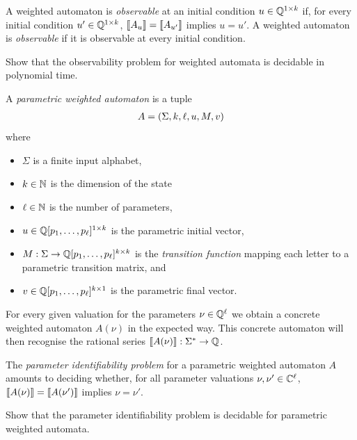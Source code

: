 A weighted automaton is \emph{observable} at an initial condition $u \in \mathbb Q^{1 \times k}$
if, for every initial condition $u' \in \mathbb Q^{1 \times k}$,
$\llbracket{A_u}\rrbracket = \llbracket{A_{u'}}\rrbracket$ implies $u = u'$.
%
A weighted automaton is \emph{observable} if it is observable at every initial condition.

 \begin{exercise}
    Show that the observability problem for weighted automata is decidable in polynomial time.
 \end{exercise}

A \emph{parametric weighted automaton} is a tuple
%
\begin{align*}
    A = \left( \Sigma, k, \ell, u, M, v \right)
\end{align*}
%
where
%
\begin{itemize}
    \item $\Sigma$ is a finite input alphabet,
    \item $k \in \mathbb N$ is the dimension of the state
    \item $\ell \in \mathbb N$ is the number of parameters,
    \item $u \in \mathbb Q[p_1, \dots, p_\ell]^{1 \times k}$ is the parametric initial vector,
    \item $M : \Sigma \to \mathbb Q[p_1, \dots, p_\ell]^{k \times k}$
    is the \emph{transition function} mapping each letter to a parametric transition matrix, and
    \item $v \in \mathbb Q[p_1, \dots, p_\ell]^{k \times 1}$ is the parametric final vector.
\end{itemize}
%
For every given valuation for the parameters $\nu \in \mathbb Q^\ell$
we obtain a concrete weighted automaton $A(\nu)$ in the expected way.
This concrete automaton will then recognise the rational series $\llbracket{A(\nu)}\rrbracket : \Sigma^* \to \mathbb Q$.


The \emph{parameter identifiability problem} for a parametric weighted automaton $A$
amounts to deciding whether, for all parameter valuations $\nu, \nu' \in \mathbb C^\ell$,
$\llbracket{A(\nu)}\rrbracket = \llbracket{A(\nu')}\rrbracket$ implies $\nu = \nu'$.

 \begin{exercise}
    Show that the parameter identifiability problem is decidable for parametric weighted automata.
 \end{exercise}




